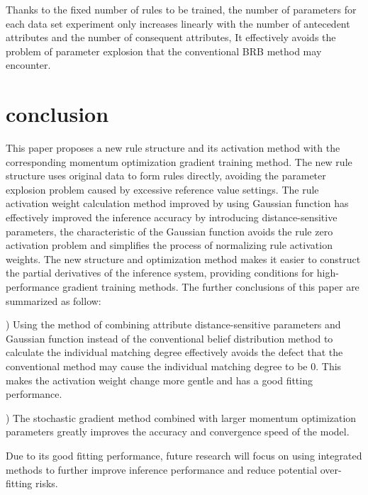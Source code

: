 \documentclass{ieeeaccess}
\begin{document}
Thanks to the fixed number of rules to be trained, the number of parameters for each data set experiment only increases linearly with the number of antecedent attributes and the number of consequent attributes,
It effectively avoids the problem of parameter explosion that the conventional BRB method may encounter.

\section{conclusion}
This paper proposes a new rule structure and its activation method with the corresponding momentum optimization gradient training method.
The new rule structure uses original data to form rules directly, avoiding the parameter explosion problem caused by excessive reference value settings.
The rule activation weight calculation method improved by using Gaussian function has effectively improved the inference accuracy by introducing distance-sensitive parameters,
the characteristic of the Gaussian function avoids the rule zero activation problem and simplifies the process of normalizing rule activation weights.
The new structure and optimization method makes it easier to construct the partial derivatives of the inference system,
providing conditions for high-performance gradient training methods.
The further conclusions of this paper are summarized as follow:

) Using the method of combining attribute distance-sensitive parameters and Gaussian function instead of
the conventional belief distribution method to calculate the individual matching degree effectively avoids the defect that
the conventional method may cause the individual matching degree to be 0.
This makes the activation weight change more gentle and has a good fitting performance.

) The stochastic gradient method combined with larger momentum optimization parameters greatly improves the accuracy and convergence speed of the model.

Due to its good fitting performance, future research will focus on using integrated methods to further improve inference performance and reduce potential over-fitting risks.
\end{document}
